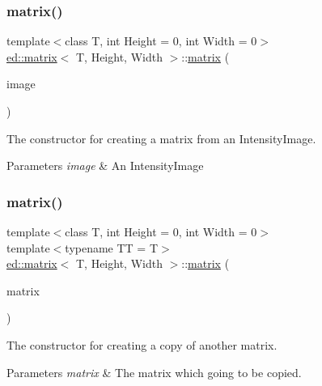 \subsubsection{\texorpdfstring{matrix()}{matrix()}\hspace{0.1cm}{\footnotesize\ttfamily [2/3]}}
{\footnotesize\ttfamily template$<$class T, int Height = 0, int Width = 0$>$ \\
\mbox{\hyperlink{classed_1_1matrix}{ed\+::matrix}}$<$ T, Height, Width $>$\+::\mbox{\hyperlink{classed_1_1matrix}{matrix}} (\begin{DoxyParamCaption}\item[{const Intensity\+Image \&}]{image }\end{DoxyParamCaption})\hspace{0.3cm}{\ttfamily [inline]}}

The constructor for creating a matrix from an Intensity\+Image.


\begin{DoxyParams}{Parameters}
{\em image} & An Intensity\+Image \\
\hline
\end{DoxyParams}
\mbox{\label{classed_1_1matrix_a96f0856011866bbcf92521bbf5ef9dd3}} 
\subsubsection{\texorpdfstring{matrix()}{matrix()}\hspace{0.1cm}{\footnotesize\ttfamily [3/3]}}
{\footnotesize\ttfamily template$<$class T, int Height = 0, int Width = 0$>$ \\
template$<$typename TT  = T$>$ \\
\mbox{\hyperlink{classed_1_1matrix}{ed\+::matrix}}$<$ T, Height, Width $>$\+::\mbox{\hyperlink{classed_1_1matrix}{matrix}} (\begin{DoxyParamCaption}\item[{const std\+::array$<$ std\+::array$<$ TT, Width $>$, Height $>$ \&}]{matrix }\end{DoxyParamCaption})\hspace{0.3cm}{\ttfamily [inline]}}

The constructor for creating a copy of another matrix.


\begin{DoxyParams}{Parameters}
{\em matrix} & The matrix which going to be copied. \\
\hline
\end{DoxyParams}


